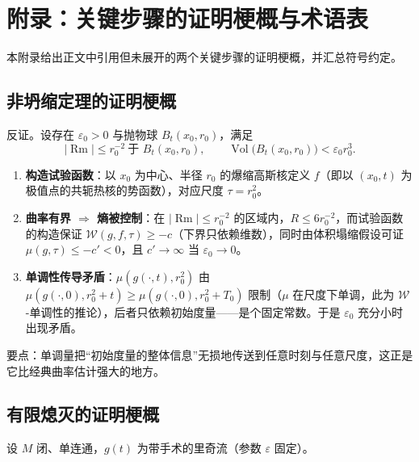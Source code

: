 \section{附录：关键步骤的证明梗概与术语表}\label{sec:appendix}

本附录给出正文中引用但未展开的两个关键步骤的证明梗概，并汇总符号约定。

\subsection{非坍缩定理的证明梗概}\label{sec:app-nocollapse}

反证。设存在 $\varepsilon_0 > 0$ 与抛物球 $B_t(x_0, r_0)$，满足
\begin{equation}
    |\operatorname{Rm}| \leq r_0^{-2} \ \text{于 } B_t(x_0, r_0),
    \qquad
    \operatorname{Vol}\bigl(B_t(x_0,r_0)\bigr) < \varepsilon_0 r_0^3 .
\end{equation}

\begin{enumerate}[label=(\arabic*)]
    \item \textbf{构造试验函数}：以 $x_0$ 为中心、半径 $r_0$ 的爆缩高斯核定义 $f$（即以 $(x_0, t)$ 为极值点的共轭热核的势函数），对应尺度 $\tau = r_0^2$。
    \item \textbf{曲率有界 $\Rightarrow$ 熵被控制}：在 $|\operatorname{Rm}| \leq r_0^{-2}$ 的区域内，$R \leq 6r_0^{-2}$，而试验函数的构造保证 $\mathcal{W}(g, f, \tau) \geq -c$（下界只依赖维数），同时由体积塌缩假设可证 $\mu(g, \tau) \leq -c' < 0$，且 $c' \to \infty$ 当 $\varepsilon_0 \to 0$。
    \item \textbf{单调性传导矛盾}：$\mu(g(\cdot,t), r_0^2)$ 由 $\mu(g(\cdot,0), r_0^2 + t) \geq \mu(g(\cdot,0), r_0^2 + T_0)$ 限制（$\mu$ 在尺度下单调，此为 $\mathcal{W}$-单调性的推论），后者只依赖初始度量——是个固定常数。于是 $\varepsilon_0$ 充分小时出现矛盾。
\end{enumerate}

要点：单调量把“初始度量的整体信息”无损地传送到任意时刻与任意尺度，这正是它比经典曲率估计强大的地方。

\subsection{有限熄灭的证明梗概}\label{sec:app-extinction}

设 $M$ 闭、单连通，$g(t)$ 为带手术的里奇流（参数 $\varepsilon$ 固定）。

